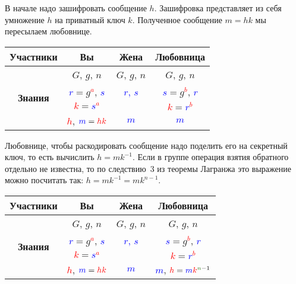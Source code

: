 В начале надо зашифровать сообщение $h$.
Зашифровка представляет из себя умножение $h$ на приватный ключ $k$.
Полученное сообщение $m = hk$ мы пересылаем любовнице.
\begin{center}
\begin{tabular}{|c|c|c|c|}
\hline
{\bf Участники}&{Вы}&{Жена}&{Любовница}\\
\hline
\multirow{4}{*}{\bf Знания}&{\textcolor{OliveGreen}{$G$}, \textcolor{OliveGreen}{$g$}, \textcolor{OliveGreen}{$n$}}&{\textcolor{OliveGreen}{$G$}, \textcolor{OliveGreen}{$g$}, \textcolor{OliveGreen}{$n$}}&{\textcolor{OliveGreen}{$G$}, \textcolor{OliveGreen}{$g$}, \textcolor{OliveGreen}{$n$}}\\
{}&{ \textcolor{blue}{$r$}$=$\textcolor{OliveGreen}{$ g$}\textcolor{red}{${}^a$}, \textcolor{blue}{$s$}}&{\textcolor{blue}{$r$, $s$}}&{ \textcolor{blue}{$s$}$=$\textcolor{OliveGreen}{$g$}\textcolor{red}{${}^b$}, \textcolor{blue}{$r$}}\\
{}&{ \textcolor{red}{$k$}$=$\textcolor{blue}{$s$}\textcolor{red}{${}^a$}}&{}&{ \textcolor{red}{$k$}$=$\textcolor{blue}{$r$}\textcolor{red}{${}^b$}}\\
{}&{\textcolor{red}{$h$}, $\textcolor{blue}{m} = \textcolor{red}{hk}$}&{\textcolor{blue}{$m$}}&{\textcolor{blue}{$m$}}\\
\hline
\end{tabular}
\end{center}

Любовнице, чтобы раскодировать сообщение надо поделить его на секретный ключ, то есть вычислить $h = m k^{-1}$.
Если в группе операция взятия обратного отдельно не известна, то по следствию~3 из теоремы Лагранжа это выражение можно посчитать так: $h = m k^{-1} = m k^{n - 1}$.
\begin{center}
\begin{tabular}{|c|c|c|c|}
\hline
{\bf Участники}&{Вы}&{Жена}&{Любовница}\\
\hline
\multirow{4}{*}{\bf Знания}&{\textcolor{OliveGreen}{$G$}, \textcolor{OliveGreen}{$g$}, \textcolor{OliveGreen}{$n$}}&{\textcolor{OliveGreen}{$G$}, \textcolor{OliveGreen}{$g$}, \textcolor{OliveGreen}{$n$}}&{\textcolor{OliveGreen}{$G$}, \textcolor{OliveGreen}{$g$}, \textcolor{OliveGreen}{$n$}}\\
{}&{ \textcolor{blue}{$r$}$=$\textcolor{OliveGreen}{$ g$}\textcolor{red}{${}^a$}, \textcolor{blue}{$s$}}&{\textcolor{blue}{$r$, $s$}}&{ \textcolor{blue}{$s$}$=$\textcolor{OliveGreen}{$g$}\textcolor{red}{${}^b$}, \textcolor{blue}{$r$}}\\
{}&{ \textcolor{red}{$k$}$=$\textcolor{blue}{$s$}\textcolor{red}{${}^a$}}&{}&{ \textcolor{red}{$k$}$=$\textcolor{blue}{$r$}\textcolor{red}{${}^b$}}\\
{}&{\textcolor{red}{$h$}, $\textcolor{blue}{m} = \textcolor{red}{hk}$}&{\textcolor{blue}{$m$}}&{\textcolor{blue}{$m$}, $\textcolor{red}{h} = \textcolor{blue}{m} \textcolor{red}{k}^{\textcolor{OliveGreen}{n}-1}$}\\
\hline
\end{tabular}
\end{center}

